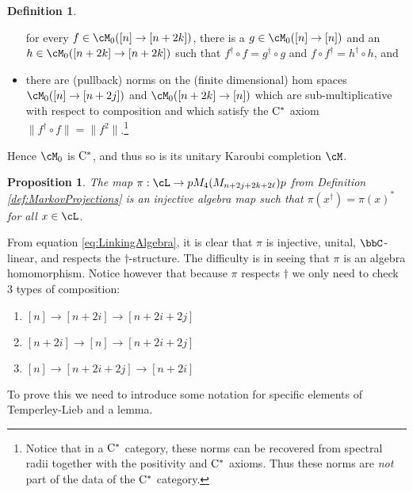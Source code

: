 \documentclass[11pt]{article}
\theoremstyle{plain}
\newtheorem{prop}[thm]{Proposition}
\theoremstyle{definition}
\newtheorem{defn}[thm]{Definition}
\newcommand{\Cstar}{\rm{C^*}}
\begin{document}
\begin{defn}
\begin{itemize}
for every $f\in \cM_0([n]\to [n+2k])$, there is a $g\in \cM_0([n] \to [n])$ and an $h\in \cM_0([n+2k]\to [n+2k])$ such that 
$f^\dag \circ f = g^\dag \circ g$ and $f\circ f^\dag = h^\dag \circ h$, and
\item
there are (pullback) norms on the (finite dimensional) hom spaces $\cM_0([n]\to [n+2j])$ and $\cM_0([n+2k] \to [n])$ which are sub-multiplicative with respect to composition and which satisfy the $\Cstar$ axiom $\|f^\dag \circ f \| = \|f^2\|$.\footnote{
Notice that in a $\Cstar$ category, these norms can be recovered from spectral radii together with the positivity and $\Cstar$ axioms.
Thus these norms are \emph{not} part of the data of the $\Cstar$ category.
}
\end{itemize}
Hence $\cM_0$ is $\Cstar$, and thus so is its unitary Karoubi completion $\cM$.
\end{defn}


\begin{prop}
\label{prop:InjectiveAlgebraMap}
The map $\pi: \cL \to pM_4(M_{n+2j+2k+2\ell})p$ from Definition \ref{def:MarkovProjections} is an injective algebra map such that $\pi(x^\dag) = \pi(x)^*$ for all $x\in \cL$.
\end{prop}

	From equation \ref{eq:LinkingAlgebra}, it is clear that $\pi$ is injective, unital, $\bbC$-linear, and respects the $\dag$-structure. The difficulty is in seeing that $\pi$ is an algebra homomorphism. Notice however that because $\pi$ respects $\dag$ we only need to check 3 types of composition:
	\begin{enumerate}
		\item $[n]\rightarrow [n+2i]\rightarrow [n+2i+2j] $
		\item $[n+2i]\rightarrow [n] \rightarrow [n+2i+2j] $
		\item $[n]\rightarrow [n+2i+2j] \rightarrow [n+2i]$
	\end{enumerate}
To prove this we need to introduce some notation for specific elements of Temperley-Lieb and a lemma.
\end{document}
